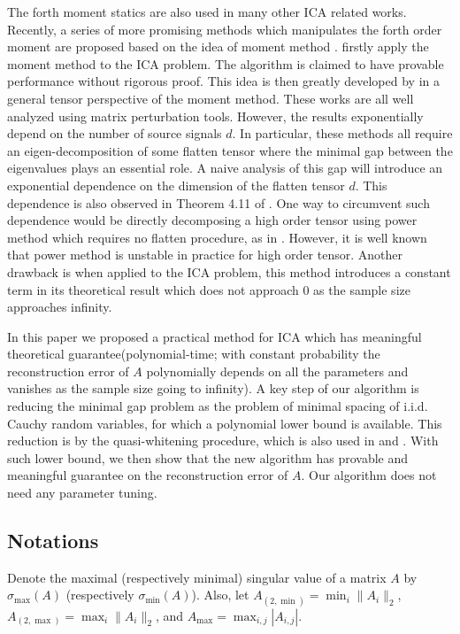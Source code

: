 \documentclass[twoside]{article}
\theoremstyle{definition}
\begin{document}
The forth moment statics are also used in many other ICA related works. 
Recently, a series of more promising methods which manipulates the forth order moment are proposed based on the idea of moment method \citep{hsu2013learning,anandkumar2012tensordecomposition,anandkumar2012method}. 
\citep{hsu2013learning} firstly apply the moment method to the ICA problem. The algorithm is claimed to have provable performance without rigorous proof. 
This idea is then greatly developed by \citep{anandkumar2012tensordecomposition,anandkumar2012method,goyal2014fourier} in a general tensor perspective of the moment method. 
These works are all well analyzed using matrix perturbation tools. 
However, the results exponentially depend on the number of source signals $d$.
In particular, these methods all require an eigen-decomposition of some flatten tensor where the minimal gap between the eigenvalues plays an essential role. 
A naive analysis of this gap will introduce an exponential dependence on the dimension of the flatten tensor $d$. 
This dependence is also observed in Theorem 4.11 of \citep{goyal2014fourier}.
One way to circumvent such dependence would be directly decomposing a high order tensor using power method which requires no flatten procedure, as in \citep{anandkumar2014guaranteed}. 
However, it is well known that power method is unstable in practice for high order tensor. 
Another drawback is when applied to the ICA problem, this method introduces a constant term in its theoretical result which does not approach 0 as the sample size approaches infinity. 

In this paper we proposed a practical method for ICA which has meaningful theoretical guarantee(polynomial-time; with constant probability the reconstruction error of $A$ polynomially depends on all the parameters and vanishes as the sample size going to infinity).      
A key step of our algorithm is reducing the minimal gap problem as the problem of minimal spacing of i.i.d. Cauchy random variables, for which a polynomial lower bound is available.
This reduction is by the quasi-whitening procedure, which is also used in \citep{frieze1996learning} and \citep{arora2012provable}.
With such lower bound, we then show that the new algorithm has provable and meaningful guarantee on the reconstruction error of $A$. 
Our algorithm does not need any parameter tuning.

\subsection{Notations}
Denote the maximal (respectively minimal) singular value of a matrix $A$ by  $\sigma_{\max}(A)$ (respectively $\sigma_{\min}(A)$). Also, let $A_{(2,\min)} = \min_{i} \|A_i\|_2$, $A_{(2,\max)} = \max_{i} \|A_i\|_2$, and $A_{\max} = \max_{i,j} |A_{i,j}|$.
\end{document}
